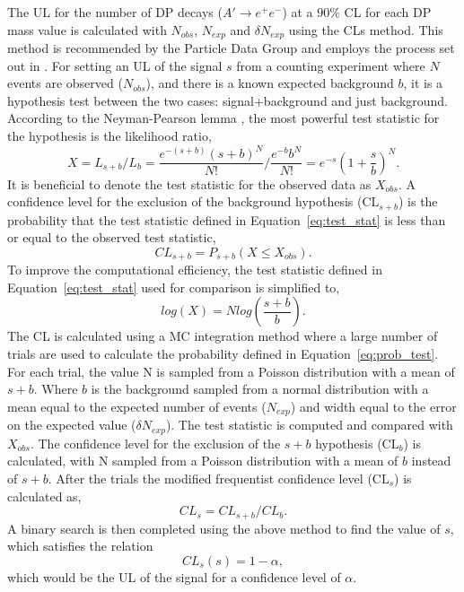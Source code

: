 \documentclass[../../main.tex]{subfiles}
\begin{document}
    The \gls{UL} for the number of \gls{DP} decays ($A' \to e^+e^-$) at a 90\% \gls{CL} for each \gls{DP} mass value is calculated with $N_{obs}$, $N_{exp}$ and $\delta N_{exp}$ using the CLs method. This method is recommended by the Particle Data Group \cite{Cowan:2018} and employs the process set out in \cite{Junk:1999kv, Read:2000ru}.
    For setting an \gls{UL} of the signal $s$ from a counting experiment where $N$ events are observed ($N_{obs}$), and there is a known expected background $b$, it is a hypothesis test between the two cases: signal+background and just background. According to the Neyman-Pearson lemma \cite{NeymanPearson1933}, the most powerful test statistic for the hypothesis is the likelihood ratio, 
    \begin{equation}\label{eq:test_stat}
        X = L_{s+b} / L_b = \frac{e^{-(s+b)}(s+b)^N}{N!} / \frac{e^{-b} b^N}{N!} = e^{-s}\left(1+\frac{s}{b}\right)^N.
    \end{equation} 
    It is beneficial to denote the test statistic for the observed data as $X_{obs}$.
    A confidence level for the exclusion of the background hypothesis ($\text{CL}_{s+b}$) is the probability that the test statistic defined in Equation~\ref{eq:test_stat} is less than or equal to the observed test statistic, 
    \begin{equation}\label{eq:prob_test}
        CL_{s+b} = P_{s+b}(X \leq X_{obs}).
    \end{equation}
    To improve the computational efficiency, the test statistic defined in Equation~\ref{eq:test_stat} used for comparison is simplified to, 
    \begin{equation}
        log(X) = N log\left(\frac{s+b}{b}\right).
    \end{equation}
    The \gls{CL} is calculated using a \gls{MC} integration method where a large number of trials are used to calculate the probability defined in Equation~\ref{eq:prob_test}. For each trial, the value N is sampled from a Poisson distribution with a mean of $s+b$. Where $b$ is the background sampled from a normal distribution with a mean equal to the expected number of events ($N_{exp}$) and width equal to the error on the expected value ($\delta N_{exp}$).
    The test statistic is computed and compared with $X_{obs}$. The confidence level for the exclusion of the $s+b$ hypothesis ($\text{CL}_{b}$) is calculated, with N sampled from a Poisson distribution with a mean of $b$ instead of $s+b$. 
    After the trials the modified frequentist confidence level ($\text{CL}_s$) is calculated as,
    \begin{equation}
        CL_s = CL_{s+b} / CL_b.
    \end{equation}
    A binary search is then completed using the above method to find the value of $s$, which satisfies the relation
    \begin{equation}
        CL_s(s) = 1 - \alpha,
    \end{equation}
    which would be the \gls{UL} of the signal for a confidence level of $\alpha$.
    
\end{document}
